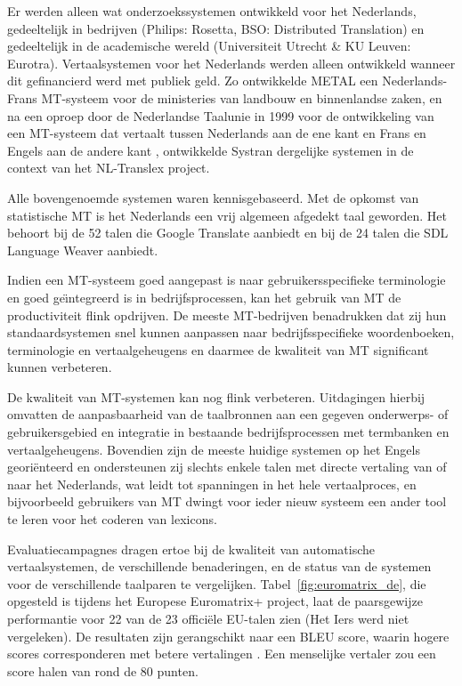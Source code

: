 \begin{multicols}{2}
\begin{figure}[tb]
\end{figure}
%
 Er werden alleen wat onderzoekssystemen ontwikkeld voor het Nederlands, gedeeltelijk in bedrijven (Philips: Rosetta, BSO: Distributed Translation) en gedeeltelijk in de academische wereld (Universiteit Utrecht \& KU Leuven: Eurotra). Vertaalsystemen voor het Nederlands werden alleen ontwikkeld wanneer dit gefinancierd werd met publiek geld. Zo ontwikkelde METAL een Nederlands-Frans MT-systeem voor de ministeries van landbouw en binnenlandse zaken, en na een oproep door de Nederlandse Taalunie in 1999 voor de ontwikkeling van een MT-systeem dat vertaalt tussen Nederlands aan de ene kant en Frans en Engels aan de andere kant \cite{Cucchiarini:etal:2000}, ontwikkelde Systran dergelijke systemen in de context van het NL-Translex project.

    Alle bovengenoemde systemen waren kennisgebaseerd. Met de opkomst van statistische MT is het Nederlands een vrij algemeen afgedekt taal geworden. Het behoort bij de 52 talen die Google Translate aanbiedt en bij de 24 talen die SDL Language Weaver aanbiedt.

    Indien een MT-systeem goed aangepast is naar gebruikersspecifieke terminologie en goed ge{\"\i}ntegreerd is in bedrijfsprocessen, kan het gebruik van MT de productiviteit flink opdrijven. De meeste MT-bedrijven benadrukken dat zij hun standaardsystemen snel kunnen aanpassen naar bedrijfsspecifieke woordenboeken, terminologie en vertaalgeheugens en daarmee de kwaliteit van MT significant kunnen verbeteren.

    De kwaliteit van MT-systemen kan nog flink verbeteren. Uitdagingen hierbij omvatten de aanpasbaarheid van de taalbronnen aan een gegeven onderwerps- of gebruikersgebied en integratie in bestaande bedrijfsprocessen met termbanken en vertaalgeheugens. Bovendien zijn de meeste huidige systemen op het Engels geori{\"e}nteerd en ondersteunen zij slechts enkele talen met directe vertaling van of naar het Nederlands, wat leidt tot spanningen in het hele vertaalproces, en bijvoorbeeld gebruikers van MT dwingt voor ieder nieuw systeem een ander tool te leren voor het coderen van lexicons.

    Evaluatiecampagnes dragen ertoe bij de kwaliteit van automatische vertaalsystemen, de verschillende benaderingen, en de status van de systemen voor de verschillende taalparen te vergelijken. Tabel~\ref{fig:euromatrix_de}, die opgesteld is tijdens het Europese Euromatrix+ project, laat de paarsgewijze performantie voor 22 van de 23 offici{\"e}le EU-talen zien (Het Iers werd niet vergeleken). De resultaten zijn gerangschikt naar een BLEU score, waarin hogere scores corresponderen met betere vertalingen \cite{bleu1}.   Een menselijke vertaler zou een score halen van rond de 80 punten.


\end{multicols}
